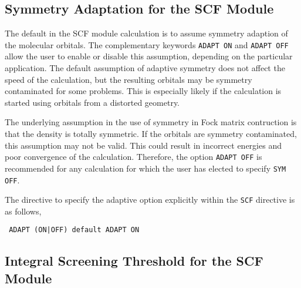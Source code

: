 \subsection{Symmetry Adaptation for the SCF Module}
\label{sec:adapt}

The default in the SCF module calculation is to assume symmetry adaption
of the molecular orbitals.  The complementary keywords \verb+ADAPT ON+
and \verb+ADAPT OFF+ allow the user to enable or disable this assumption,
depending on the particular application.  The default assumption of
adaptive symmetry does not affect the speed of the calculation, but the
resulting orbitals may be symmetry contaminated for some problems.  This
is especially likely if the calculation is started using orbitals
from a distorted geometry.

The underlying assumption in the use of symmetry in Fock matrix contruction
is that the density is totally symmetric.  If the orbitals are symmetry 
contaminated, this assumption may not be valid.  This could result in
incorrect energies and poor convergence of the calculation.  Therefore,
the option \verb+ADAPT OFF+ is recommended for any calculation for which
the user has elected to specify \verb+SYM OFF+.


The directive to specify the adaptive option explicitly within the
\verb+SCF+ directive is as follows,

\begin{verbatim}
 ADAPT (ON|OFF) default ADAPT ON
\end{verbatim}


\subsection{Integral Screening Threshold for the SCF Module}


